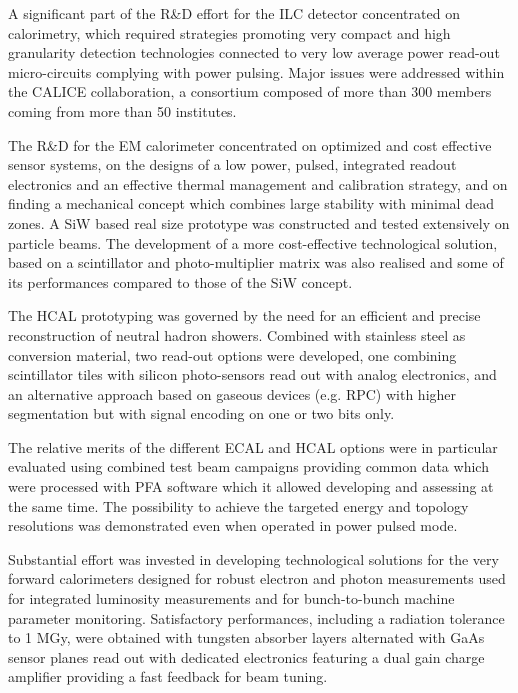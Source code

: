 \documentclass[%
 reprint,
 amsmath,amssymb,
 aps,
]{revtex4-1}
\begin{document}
A significant part of the R\&D eﬀort for the ILC detector concentrated on calorimetry, which required strategies promoting very compact and high granularity detection technologies connected to very low average power read-out micro-circuits complying with power pulsing. Major issues were addressed within the CALICE collaboration, a consortium composed of more than 300 members coming from more than 50 institutes.

The R\&D for the EM calorimeter concentrated on optimized and cost eﬀective sensor systems, on the designs of a low power, pulsed, integrated readout electronics and an eﬀective thermal management and calibration strategy, and on ﬁnding a mechanical concept which combines large stability with minimal dead zones. A SiW based real size prototype was constructed and tested extensively on particle beams. The development of a more cost-eﬀective technological solution, based on a scintillator and photo-multiplier matrix was also realised and some of its performances compared to those of the SiW concept.

The HCAL prototyping was governed by the need for an eﬃcient and precise reconstruction of neutral hadron showers. Combined with stainless steel as conversion material, two read-out options were developed, one combining scintillator tiles with silicon photo-sensors read out with analog electronics, and an alternative approach based on gaseous devices (e.g. RPC) with higher segmentation but with signal encoding on one or two bits only.

The relative merits of the diﬀerent ECAL and HCAL options were in particular evaluated using combined test beam campaigns providing common data which were processed with PFA software which it allowed developing and assessing at the same time. The possibility to achieve the targeted energy and topology resolutions was demonstrated even when operated in power pulsed mode.

Substantial eﬀort was invested in developing technological solutions for the very forward calorimeters designed for robust electron and photon measurements used for integrated luminosity measurements and for bunch-to-bunch machine parameter monitoring. Satisfactory performances, including a radiation tolerance to 1 MGy, were obtained with tungsten absorber layers alternated with GaAs sensor planes read out with dedicated electronics featuring a dual gain charge ampliﬁer providing a fast feedback for beam tuning.
\end{document}
